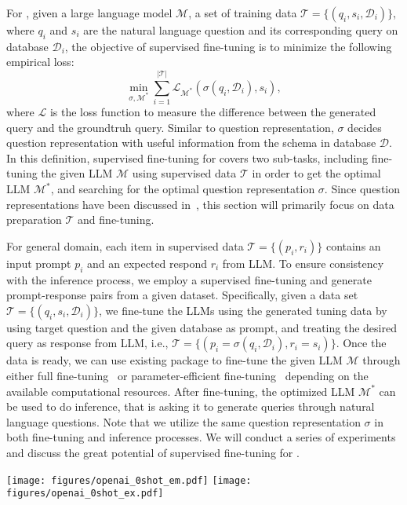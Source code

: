For \nlsql, given a large language model $\mathcal{M}$, a set of \nlsql training data $\mathcal{T}=\{(q_i, s_i, \mathcal{D}_i)\}$, where $q_i$ and $s_i$ are the natural language question and its corresponding query on database $\mathcal{D}_i$, the objective of supervised fine-tuning is to minimize the following empirical loss:
\begin{equation*}
    \min_{\sigma, \mathcal{M}^*} \sum_{i=1}^{|\mathcal{T}|}{\mathcal{L}_{\mathcal{M^*}}(\sigma(q_i, \mathcal{D}_i), s_i)},
\end{equation*}
where $\mathcal{L}$ is the loss function to measure the difference between the generated query and the groundtruh query. Similar to question representation, $\sigma$ decides question representation with useful information from the schema in database $\mathcal{D}$. 
In this definition, supervised fine-tuning for \nlsql covers two sub-tasks, including fine-tuning the given LLM $\mathcal{M}$ using supervised data $\mathcal{T}$ in order to get the optimal LLM $\mathcal{M}^*$, and searching for the optimal question representation $\sigma$. 
Since question representations have been discussed in~, this section will primarily focus on data preparation $\mathcal{T}$ and fine-tuning. 

For general domain, each item in supervised data $\mathcal{T} = \{(p_i, r_i)\}$ contains an input prompt $p_i$ and an expected respond $r_i$ from LLM. 
To ensure consistency with the inference process, we employ a supervised fine-tuning and generate prompt-response pairs from a given \nlsql dataset. Specifically, given a \nlsql data set $\mathcal{T} = \{(q_i, s_i, \mathcal{D}_i)\}$, we fine-tune the LLMs using the generated tuning data by using target question and the given database as prompt, and treating the desired query as response from LLM, i.e.,  $\mathcal{T} = \{(p_i = \sigma(q_i, \mathcal{D}_i), r_i = s_i)\}$. 
Once the data is ready, we can use existing package to fine-tune the given LLM $\mathcal{M}$ through either full fine-tuning~\cite{instructgpt} or parameter-efficient fine-tuning~\cite{DBLP:conf/iclr/HuSWALWWC22} depending on the available computational resources. After fine-tuning, the optimized LLM $\mathcal{M}^*$ can be used to do inference, that is asking it to generate queries through natural language questions.
Note that we utilize the same question representation $\sigma$ in both fine-tuning and inference processes.
We will conduct a series of experiments and discuss the great potential of supervised fine-tuning for \nlsql.\begin{figure*}[t]
    \centering
    \texttt{[image: figures/openai\_0shot\_em.pdf]}
    \texttt{[image: figures/openai\_0shot\_ex.pdf]}
    \caption{}
	\label{fig:openai_zero_shot}
\end{figure*}

